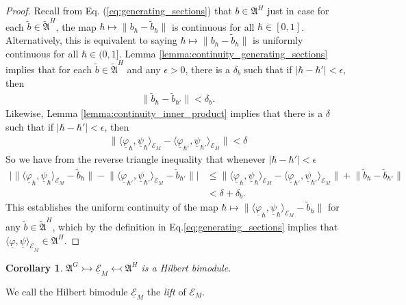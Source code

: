 \documentclass[sn-mathphys,Numbered]{sn-jnl}
\newtheorem{cor}[theorem]{Corollary}%
\providecommand{\norm}[1]{\lVert#1\rVert}
\providecommand{\abs}[1]{\lvert#1\rvert}
\providecommand{\inner}[2]{\langle#1,#2\rangle}
\begin{document}
\begin{proof}
Recall from Eq. (\ref{eq:generating_sections}) that $b\in \mathfrak{A}^H$ just in case for each $\tilde{b}\in \tilde{\mathfrak{A}}^H$, the map $\hbar\mapsto\norm{b_\hbar - \tilde{b}_\hbar}$ is continuous for all $\hbar\in [0,1]$. Alternatively, this is equivalent to saying $\hbar\mapsto\norm{b_\hbar - \tilde{b}_\hbar}$ is uniformly continuous for all $\hbar\in (0,1]$.  Lemma \ref{lemma:continuity_generating_sections} implies that for each $\tilde{b}\in\tilde{\mathfrak{A}}^H$ and any $\epsilon>0$, there is a $\delta_b$ such that if $\abs{\hbar-\hbar'}<\epsilon$, then
\begin{align}
    \norm{\tilde{b}_\hbar - \tilde{b}_{\hbar'}}<\delta_b.
\end{align}
Likewise, Lemma \ref{lemma:continuity_inner_product} implies that there is a $\delta$ such that if $\abs{\hbar-\hbar'}<\epsilon$, then
\begin{align}
    \norm{\inner{\underline{\varphi}_\hbar}{\underline{\psi}_\hbar}_{\mathcal{E}_M} - \inner{\underline{\varphi}_{\hbar'}}{\underline{\psi}_{\hbar'}}_{\mathcal{E}_M}}<\delta
\end{align}
So we have from the reverse triangle inequality that whenever $\abs{\hbar-\hbar'}<\epsilon$
\begin{align}
\Big|\norm{\inner{\underline{\varphi}_\hbar}{\underline{\psi}_\hbar}_{\mathcal{E}_M} - \tilde{b}_\hbar} - \norm{\inner{\underline{\varphi}_{\hbar'}}{\underline{\psi}_{\hbar'}}_{\mathcal{E}_M} - \tilde{b}_{\hbar'}}\Big|&\leq \norm{\inner{\underline{\varphi}_\hbar}{\underline{\psi}_\hbar}_{\mathcal{E}_M} - \inner{\underline{\varphi}_{\hbar'}}{\underline{\psi}_{\hbar'}}_{\mathcal{E}_M}} + \norm{\tilde{b}_\hbar - \tilde{b}_{\hbar'}}\\
&<\delta + \delta_b.
\end{align}
This establishes the uniform continuity of the map $\hbar\mapsto \norm{\inner{\underline{\varphi}_\hbar}{\underline{\psi}_\hbar}_{\mathcal{E}_M}-\tilde{b}_\hbar}$ for any $\tilde{b}\in\tilde{\mathfrak{A}}^H$, which by the definition in Eq.\eqref{eq:generating_sections} implies that $\inner{\underline{\varphi}}{\underline{\psi}}_{\underline{\mathcal{E}}_M}\in\mathfrak{A}^H$.
\end{proof}

\begin{cor}
\label{cor:lift}
$\mathfrak{A}^G\rightarrowtail\underline{\mathcal{E}}_M\leftarrowtail\mathfrak{A}^H$ is a Hilbert bimodule.
\end{cor}\bigskip
\noindent We call the Hilbert bimodule $\underline{\mathcal{E}}_{M}$ the \emph{lift} of $\mathcal{E}_M$.
\end{document}
